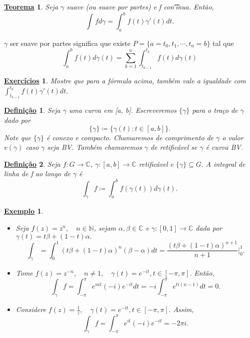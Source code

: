 \documentclass{article}
\newtheorem*{def*}{\underline{Defini\c c\~ao}}
\newtheorem*{theorem*}{\underline{Teorema}}
\newtheorem{example}{\underline{Exemplo}}[section]
\newtheorem*{exer*}{\underline{Exerc\'icios}}
\begin{document}
  \begin{theorem*}
    Seja $\gamma$ suave (ou suave por partes) e f con\t'inua. Ent\~ao, 
    $$
    \int_{}^{}f d \gamma = \int_{a}^{b}f(t)\gamma'(t)dt.
    $$
  \end{theorem*}
  $\gamma$ ser suave por partes significa que existe $P =\{a=t_{0}, t_1, \cdots, t_{n} = b\} $ tal que 
  $$
  \int_{a}^{b}f(t)d\gamma(t) = \sum\limits_{k=1}^{n}\int_{t_{k-1}}^{t_{k}}f(t)d\gamma(t)
  $$
  \begin{exer*}
    Mostre que para a f\'ormula acima, tamb\'em vale a igualdade com $\int_{t_{k-1}}^{t_{k}}f(t)\gamma'(t)dt.$
  \end{exer*}
  \begin{def*}
    Seja $\gamma$ uma curva em [a, b]. Escreveremos $\{\gamma\} $ para o tra\c co de $\gamma$ dado por 
    $$
    \{\gamma\}\coloneqq  \{\gamma(t): t\in{[a, b]}\}.
    $$
    Note que $\{\gamma\} $ \'e conexo e compacto. Chamaremos de comprimento de $\gamma$ o valor $v(\gamma)$ caso $\gamma$ seja BV.
    Tamb\'em chamaremos $\gamma$ de retific\'avel se $\gamma$ \'e curva BV.
  \end{def*}
  \begin{def*}
    Seja $f:G\rightarrow \mathbb{C}$, $\gamma:[a, b]\rightarrow \mathbb{C}$ retific\'avel e $\{\gamma\}\subseteq{G}.$ A integral de 
    linha de f ao longo de $\gamma$ \'e 
    $$
    \int_{\gamma}^{}f \coloneqq  \int_{a}^{b}f(\gamma(t))d\gamma(t).
    $$
  \end{def*}
  \begin{example}
    \begin{itemize}
      \item[i)] Seja $f(z) = z^n, \quad n\in{\mathbb{N}}$, sejam $\alpha, \beta\in \mathbb{C}$ e $\gamma:[0, 1]\rightarrow \mathbb{C}$
        dada por $\gamma(t) = t \beta + (1-t)\alpha.$
        $$
        \int_{\gamma}^{}=\int_{0}^{1}(t\beta + (1-t)\alpha)^n(\beta - \alpha)dt = \frac{(t\beta + (1-t)\alpha)^{n+1}}{n+1}\biggl|_0^1\biggr.
        $$
      \item[ii)] Tome $f(z) = z^{-n}, \quad n\neq1, \quad \gamma(t) = e^{-it}, t\in[-\pi, \pi].$ Ent\~ao,
        $$
        \int_{\gamma}^{}f = \int_{-\pi}^{\pi}e^{nit}(-i)e^{-it}dt = -i \int_{-\pi}^{\pi}e^{ti(n-1)}dt = 0.
        $$
      \item[iii)] Considere $f(z) = \frac{1}{z}, \quad \gamma(t) = e^{-it}, t\in[-\pi, \pi].$ Assim, 
        $$
        \int_{\gamma}^{}f = \int_{-\pi}^{\pi}e^{it}(-i)e^{-it} = -2\pi i.
        $$
    \end{itemize}
  \end{example}
\end{document}
